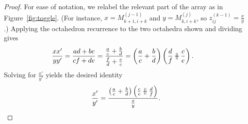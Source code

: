 \documentclass[ALCO,Unicode,published]{cedram}
\numberwithin{equation}{section}
\newcommand{\parallelsum}{\:\ \mathclap{\|}\mathclap{-}\ \:}
\begin{document}
\begin{proof} For ease of notation, we relabel the relevant part of the array as in Figure~\ref{fig:toggle}. (For instance, $x = M_{k+1,i+k}^{(j-1)}$ and $y = M_{k,i+k}^{(j)}$, so $z_{ij}^{(k-1)} = \frac{x}{y}$.) Applying the octahedron recurrence to the two octahedra shown and dividing gives
\begin{align*}
    \frac{xx'}{yy'} &= \frac{ad+bc}{cf+de} 
= \frac{\frac{a}{c} + \frac{b}{d}}{\frac{f}{d} + \frac{e}{c}}
    = \left( \frac{a}{c} + \frac{b}{d} \right) \left(\frac{d}{f} \parallelsum  \frac{c}{e} \right).  
\end{align*}
Solving for $\frac{x'}{y'}$ yields the desired identity
\[\frac{x'}{y'}=  \frac{\left( \frac{a}{c} + \frac{b}{d} \right) \left(\frac{c}{e} \parallelsum  \frac{d}{f} \right)}{\frac xy}.\qedhere\]
\end{proof}
\end{document}
